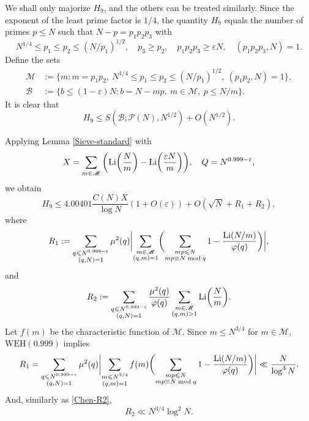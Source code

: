 \documentclass[12pt, a4paper]{amsart}
\def\Li{\hbox{{\rm Li}}}
\def\le{\leqslant}
\def\ge{\geqslant}
\theoremstyle{plain}
\theoremstyle{remark}
\numberwithin{equation}{section}
\begin{document}
We shall only majorize $H_9$, and the others can be treated similarly.
Since the exponent of the least prime factor is $1/4$, the quantity $H_9$ equals the number of primes $p \leqslant N$ such that $N - p = p_1p_2p_3$ with
\begin{equation}
N^{1/4} \le p_1 \le p_2 \le (N/p_1)^{1/2},\quad p_3 \ge p_2,\quad p_1p_2p_3\ge \varepsilon N,\quad (p_1p_2p_3, N) = 1.
\end{equation}
Define the sets
\begin{equation}
\begin{aligned}
\mathscr{M} &:= \{ m : m = p_1p_2,\ N^{1/4} \le p_1 \le p_2 \le (N/p_1)^{1/2},\ (p_1p_2, N) = 1 \}, \\
\mathscr{B} &:= \{ b\le (1-\varepsilon) N : b = N - mp,\ m \in \mathscr{M},\ p \leqslant N/m \}.
\end{aligned}
\end{equation}
It is clear that
\[
H_9 \le S(\mathscr{B}; \mathscr{P}(N), N^{1/2}) + O(N^{1/2}).
\]

Applying Lemma \ref{Sieve-standard} with
\[
X = \sum_{m \in \mathscr{M}} \bigg(\Li\bigg( \frac{N}{m} \bigg)-\Li\bigg( \frac{\varepsilon N}{m} \bigg)\bigg),\quad Q = N^{0.999-\varepsilon},
\]
we obtain
\begin{equation}\label{H9old}
H_9 \leqslant 4.00401\frac{C(N) X}{\log N} (1 + O(\varepsilon)) + O(\sqrt{N} + R_1 +R_2),
\end{equation}
where
$$ 
R_1 := \sum_{\substack{q \leqslant N^{0.999-\varepsilon} \\ (q,N)=1}} \mu^2(q) \biggl| \sum_{\substack{m \in \mathscr{M} \\ (q,m)=1}} \biggl( \sum_{\substack{mp \leqslant N \\ mp \equiv N \bmod q}} 1 - \frac{\Li(N/m)}{\varphi(q)} \biggr) \biggr|, 
$$
and 
$$ 
R_2 := \sum_{\substack{q \leqslant N^{0.999-\varepsilon}\\ (q,N)=1}} \frac{\mu^2(q)}{\varphi(q)} \sum_{\substack{m \in \mathscr{M}\\ (q,m)>1}} \Li\biggl(\frac{N}{m}\biggr). $$
	Let $f(m)$ be the characteristic function of $\mathscr{M}$. Since $m \leqslant N^{3/4}$ for $m \in \mathscr{M}$, $\mathrm{WEH}(0.999)$ implies
\begin{equation}
R_1 = \sum_{\substack{q \leqslant N^{0.999-\varepsilon} \\ (q,N)=1}} \mu^2(q) \biggl| \sum_{\substack{m \leqslant N^{3/4} \\ (q,m)=1}} f(m) \biggl( \sum_{\substack{mp \leqslant N \\ mp \equiv N \bmod q}} 1 - \frac{\Li(N/m)}{\varphi(q)} \biggr) \biggr| \ll \frac{N}{\log^{3} N}.
\end{equation}
And, similarly as \eqref{Chen-R2}, 
	\begin{equation}
	R_2 \ll N^{3/4} \log^{2} N.
	\end{equation}
\end{document}
